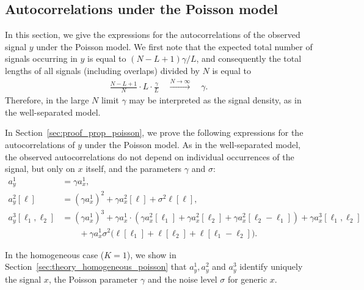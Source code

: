 \documentclass[12pt]{article}
\newcommand{\1}{\mathbf{1}}
\newcommand{\Poisson}{\text{Poisson}}
\theoremstyle{plain}
\theoremstyle{definition}
\theoremstyle{remark}
\theoremstyle{plain}
\theoremstyle{remark}
\theoremstyle{plain}
\theoremstyle{plain}
\theoremstyle{plain}
\numberwithin{equation}{section}
\begin{document}
\subsection{Autocorrelations under the Poisson model}

In this section, we give the expressions for the autocorrelations of the observed signal $y$ under the Poisson model. %
 We first note that the expected total number of signals occurring in $y$ is equal to $(N - L + 1)\gamma / L$, and consequently the total lengths of all signals (including overlaps) divided by $N$ is equal to
%
\begin{align}
\frac{N - L + 1}{N} \cdot L \cdot \frac{\gamma  }{L} 
\quad \overset{N\to\infty}{\longrightarrow} \quad \gamma.
\end{align}
%
Therefore, in the large $N$ limit $\gamma$ may be interpreted as the signal density, as in the well-separated model.

In Section~\ref{sec:proof_prop_poisson}, we prove the following expressions for the autocorrelations of $y$ under the Poisson model. As in the well-separated model, the observed autocorrelations do not depend on individual occurrences of the signal, but only on $x$ itself, and the parameters $\gamma$ and $\sigma$:
%
\begin{align}
a_y^1  &=  \gamma a_{x}^1, 
\label{eq:mean_micrograph2} \\
a_y^2[\ell] &=  (\gamma a_x^1)^2 + \gamma a_x^2[\ell] + \sigma^2 \ell[\ell], 
\label{eq:ac2_micrograph2} \\
a_y^3[\ell_1,\ell_2]  & = (\gamma a_x^1)^3 + \gamma a_x^1  
\cdot ( \gamma a_x^2[\ell_1] + \gamma a_x^2[\ell_2]
+ \gamma a_x^2[\ell_2-\ell_1]) + \gamma a_x^3[\ell_1,\ell_2] 
\nonumber \\
& \qquad + \gamma a_x^1 \sigma^2 \big(\ell[\ell_1]+\ell[\ell_2] +\ell[\ell_1-\ell_2] \big).
\label{eq:ac3_micrograph2}
\end{align}

In the homogeneous case ($K=1$), we show in Section~\ref{sec:theory_homogeneous_poisson} that $a_y^1,a_y^2$ and $a_y^3$ identify uniquely the signal $x$, the Poisson parameter $\gamma$ and the noise level $\sigma$ for generic $x$. 
%
\end{document}
